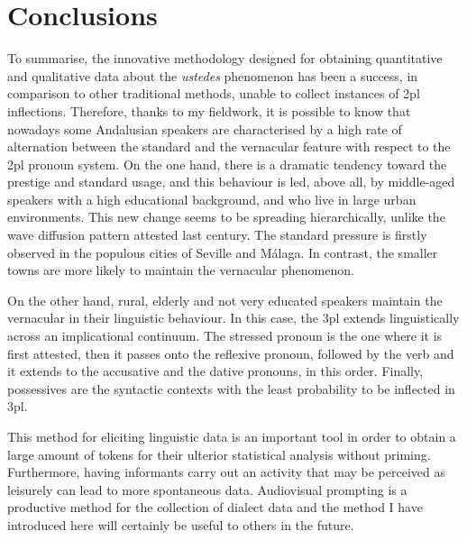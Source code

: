 \documentclass[output=paper]{LSP/langsci}
\begin{document}
\section{Conclusions}
To summarise, the innovative methodology designed for obtaining quantitative and qualitative data about the \textit{ustedes} phenomenon has been a success, in comparison to other traditional methods, unable to collect instances of 2pl inflections. Therefore, thanks to my fieldwork, it is possible to know that nowadays some Andalusian speakers are characterised by a high rate of alternation between the standard and the vernacular feature with respect to the 2pl pronoun system. On the one hand, there is a dramatic tendency toward the prestige and standard usage, and this behaviour is led, above all, by middle-aged speakers with a high educational background, and who live in large urban environments. This new change seems to be spreading hierarchically, unlike the wave diffusion pattern attested last century. The standard pressure is firstly observed in the populous cities of Seville and Málaga. In contrast, the smaller towns are more likely to maintain the vernacular phenomenon.

\largerpage[-1]
On the other hand, rural, elderly and not very educated speakers maintain the vernacular in their linguistic behaviour. In this case, the 3pl extends linguistically across an implicational continuum. The stressed pronoun is the one where it is first attested, then it passes onto the reflexive pronoun, followed by the verb and it extends to the accusative and the dative pronouns, in this order. Finally, possessives are the syntactic contexts with the least probability to be inflected in 3pl.

This method for eliciting linguistic data is an important tool in order to obtain a large amount of tokens for their ulterior statistical analysis without priming. Furthermore, having informants carry out an activity that may be perceived as leisurely can lead to more spontaneous data. Audiovisual prompting is a productive method for the collection of dialect data and the method I have introduced here will certainly be useful to others in the future.

\printbibliography[heading=subbibliography,notkeyword=this]
\end{document}
